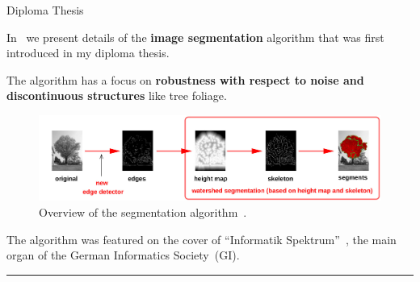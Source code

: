 \begin{frame}{Diploma Thesis }

\justifying

\vspace{2em}
In~\cite{Peters2007} we present details of the {\bf image 
segmentation} algorithm that was first introduced in my diploma thesis.

\vspace{1em}
The algorithm has a focus on {\bf robustness with respect to noise and 
discontinuous structures} like tree foliage. 

\vspace{1em}
\begin{figure}
\includegraphics[width=0.66\linewidth]{diploma_thesis/segmentation.jpg}

\vspace{-0.75em}
\caption{\scriptsize Overview of the segmentation algorithm~\cite{Peters2007}.}
\end{figure}

The algorithm was featured on the cover of ``Informatik 
Spektrum''~\cite{Kerdels2007}, the main organ of the German Informatics 
Society~(GI).

\begin{center}
\rule{2cm}{0.4pt}\\[0.5em]
\end{center}

\\[1em]

\end{frame}



